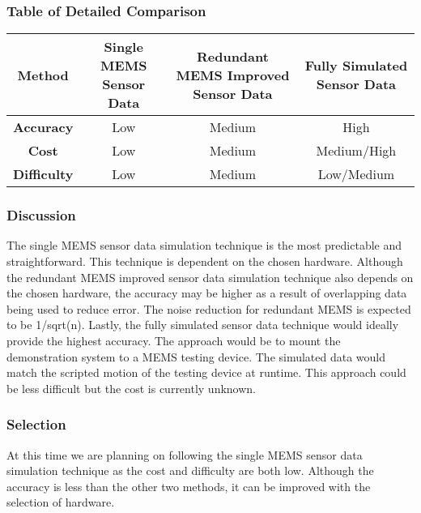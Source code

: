 \subsubsection{Table of Detailed Comparison}
\hfill \break
\begin{center}
\begin{tabular}{|c|c|c|c|}
\hline
\textbf{Method}      & \textbf{Single MEMS Sensor Data} & \textbf{Redundant MEMS Improved Sensor Data} & \textbf{Fully Simulated Sensor Data} \\ \hline
\textbf{Accuracy}    & Low  							& Medium                                       & High 								  \\ \hline
\textbf{Cost}        & Low  							& Medium                                       & Medium/High						  \\ \hline
\textbf{Difficulty}  & Low  							& Medium                                       & Low/Medium							  \\ \hline
\end{tabular}
\end{center}

\hfill \break
\subsubsection{Discussion}
The single MEMS sensor data simulation technique is the most predictable and straightforward.
This technique is dependent on the chosen hardware. Although the redundant MEMS improved sensor data simulation technique also depends on the chosen hardware, the accuracy may be higher as a result of overlapping data being used to reduce error.
The noise reduction for redundant MEMS is expected to be 1/sqrt(n). Lastly, the fully simulated sensor data technique would ideally provide the highest accuracy.
The approach would be to mount the demonstration system to a MEMS testing device. The simulated data would match the scripted motion of the testing device at runtime.
This approach could be less difficult but the cost is currently unknown. \\

\subsubsection{Selection}
At this time we are planning on following the single MEMS sensor data simulation technique as the cost and difficulty are both low.
Although the accuracy is less than the other two methods, it can be improved with the selection of hardware. \\

